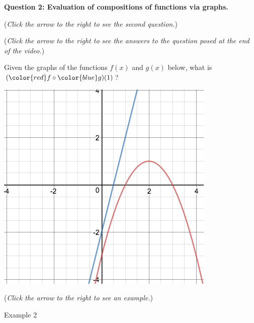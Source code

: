 \documentclass{ximera}
\begin{document}
\textbf{Question 2: Evaluation of compositions
of functions via graphs.}
\begin{question}
\begin{flushright}
{\color{blue}(\emph{Click the arrow to the right to see the second question.})}
\end{flushright}
\begin{center}
\begin{expandable}
{\color{blue}(\emph{Click the arrow to the right to see the answers 
to the question posed at the end of the video.})}
\begin{expandable}
Given the graphs of the functions {\color{red} $f(x)$}
and {\color{blue} $g(x)$} below, what is
$({\color{red} f} \circ {\color{blue} g})(1)$?
\begin{center}
\includegraphics[scale=0.5]{CompFuncGraph1.png}
\end{center}
\begin{multipleChoice}
\end{multipleChoice}
\begin{flushright}
{\color{blue}(\emph{Click the arrow to the right to see an example.})}
\end{flushright}
\begin{expandable}
Example 2
\end{expandable}
\end{expandable}
\end{expandable}
\end{center}
\end{question}
\end{document}
